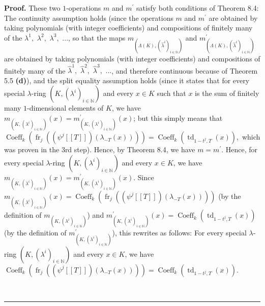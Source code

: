 \documentclass[numbers=enddot,12pt,final,onecolumn,notitlepage]{scrartcl}%
\newenvironment{proof}[1][Proof]{\noindent\textbf{#1.} }{\ \rule{0.5em}{0.5em}}
\begin{document}
\begin{proof}
These two $1$-operations $m$ and $m^{\prime}$ satisfy both conditions of
Theorem 8.4: The continuity assumption holds (since the operations $m$ and
$m^{\prime}$ are obtained by taking polynomials (with integer coefficients)
and compositions of finitely many of the $\lambda^{1},$ $\lambda^{2},$
$\lambda^{3},$ $...$, so that the maps $m_{\left(  \Lambda\left(  K\right)
,\left(  \widehat{\lambda}^{i}\right)  _{i\in\mathbb{N}}\right)  }$ and
$m_{\left(  \Lambda\left(  K\right)  ,\left(  \widehat{\lambda}^{i}\right)
_{i\in\mathbb{N}}\right)  }^{\prime}$ are obtained by taking polynomials (with
integer coefficients) and compositions of finitely many of the
$\widehat{\lambda}^{1},$ $\widehat{\lambda}^{2},$ $\widehat{\lambda}^{3},$
$...$, and therefore continuous because of Theorem 5.5 \textbf{(d)}), and the
split equality assumption holds (since it states that for every special
$\lambda$-ring $\left(  K,\left(  \lambda^{i}\right)  _{i\in\mathbb{N}%
}\right)  $ and every $x\in K$ such that $x$ is the sum of finitely many
$1$-dimensional elements of $K$, we have $m_{\left(  K,\left(  \lambda
^{i}\right)  _{i\in\mathbb{N}}\right)  }\left(  x\right)  =m_{\left(
K,\left(  \lambda^{i}\right)  _{i\in\mathbb{N}}\right)  }^{\prime}\left(
x\right)  $; but this simply means that $\operatorname*{Coeff}\nolimits_{k}%
\left(  \operatorname*{fr}\nolimits_{j}\left(  \left(  \psi^{j}\left[  \left[
T\right]  \right]  \right)  \left(  \lambda_{-T}\left(  x\right)  \right)
\right)  \right)  =\operatorname*{Coeff}\nolimits_{k}\left(
\operatorname*{td}\nolimits_{1-t^{j},T}\left(  x\right)  \right)  ,$ which was
proven in the 3rd step). Hence, by Theorem 8.4, we have $m=m^{\prime}$. Hence,
for every special $\lambda$-ring $\left(  K,\left(  \lambda^{i}\right)
_{i\in\mathbb{N}}\right)  $ and every $x\in K$, we have $m_{\left(  K,\left(
\lambda^{i}\right)  _{i\in\mathbb{N}}\right)  }\left(  x\right)  =m_{\left(
K,\left(  \lambda^{i}\right)  _{i\in\mathbb{N}}\right)  }^{\prime}\left(
x\right)  $. Since $m_{\left(  K,\left(  \lambda^{i}\right)  _{i\in\mathbb{N}%
}\right)  }\left(  x\right)  =\operatorname*{Coeff}\nolimits_{k}\left(
\operatorname*{fr}\nolimits_{j}\left(  \left(  \psi^{j}\left[  \left[
T\right]  \right]  \right)  \left(  \lambda_{-T}\left(  x\right)  \right)
\right)  \right)  $ (by the definition of $m_{\left(  K,\left(  \lambda
^{i}\right)  _{i\in\mathbb{N}}\right)  }$) and $m_{\left(  K,\left(
\lambda^{i}\right)  _{i\in\mathbb{N}}\right)  }^{\prime}\left(  x\right)
=\operatorname*{Coeff}\nolimits_{k}\left(  \operatorname*{td}%
\nolimits_{1-t^{j},T}\left(  x\right)  \right)  $ (by the definition of
$m_{\left(  K,\left(  \lambda^{i}\right)  _{i\in\mathbb{N}}\right)  }^{\prime
}$), this rewrites as follows: For every special $\lambda$-ring $\left(
K,\left(  \lambda^{i}\right)  _{i\in\mathbb{N}}\right)  $ and every $x\in K$,
we have $\operatorname*{Coeff}\nolimits_{k}\left(  \operatorname*{fr}%
\nolimits_{j}\left(  \left(  \psi^{j}\left[  \left[  T\right]  \right]
\right)  \left(  \lambda_{-T}\left(  x\right)  \right)  \right)  \right)
=\operatorname*{Coeff}\nolimits_{k}\left(  \operatorname*{td}%
\nolimits_{1-t^{j},T}\left(  x\right)  \right)  $.


\end{proof}
\end{document}
